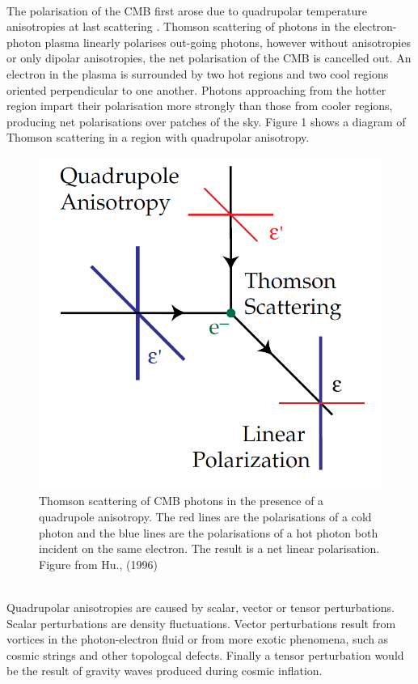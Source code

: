\\The polarisation of the CMB first arose due to quadrupolar temperature anisotropies at last scattering \cite{Hu:1997hv}. Thomson scattering of photons in the electron-photon plasma linearly polarises out-going photons, however without anisotropies or only dipolar anisotropies, the net polarisation of the CMB is cancelled out. An electron in the plasma is surrounded by two hot regions and two cool regions oriented perpendicular to one another. Photons approaching from the hotter region impart their polarisation more strongly than those from cooler regions, producing net polarisations over patches of the sky. Figure 1 shows a diagram of Thomson scattering in a region with quadrupolar anisotropy.
\\
\begin{figure}[h]
\centering
\includegraphics[scale=0.35]{images/thomson.png}
\caption{Thomson scattering of CMB photons in the presence of a quadrupole anisotropy. The red lines are the polarisations of a cold photon and the blue lines are the polarisations of a hot photon both incident on the same electron. The result is a net linear polarisation. Figure from Hu., (1996) \cite{Hu:1997hv}}
\label{fig:thomson}
\end{figure}
\\
Quadrupolar anisotropies are caused by scalar, vector or tensor perturbations. Scalar perturbations are density fluctuations. Vector perturbations result from vortices in the photon-electron fluid or from more exotic phenomena, such as cosmic strings and other topologcal defects. Finally a tensor perturbation would be the result of gravity waves produced during cosmic inflation.  

